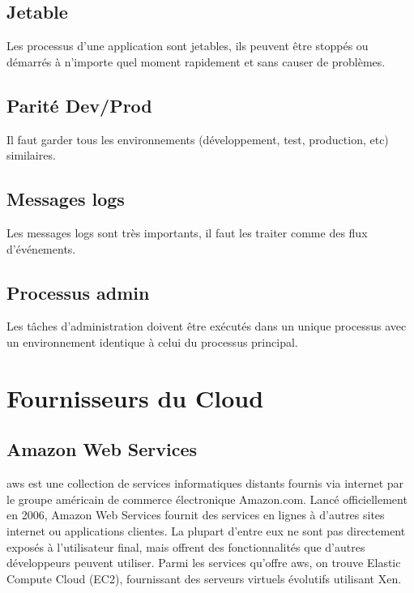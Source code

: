 \section*{Jetable}

Les processus d'une application sont jetables, ils peuvent être stoppés ou démarrés à n'importe quel moment rapidement et sans causer de problèmes.

\section*{Parité Dev/Prod}

Il faut garder tous les environnements (développement, test, production, etc) similaires.

\section*{Messages logs}

Les messages logs sont très importants, il faut les traiter comme des flux d'événements.

\section*{Processus admin}

Les tâches d'administration doivent être exécutés dans un unique processus avec un environnement identique à celui du processus principal. 

\chapter{Fournisseurs du Cloud}

\section*{Amazon Web Services}

\acrshort{aws} est une collection de services informatiques distants fournis via internet par le groupe américain de commerce électronique Amazon.com. Lancé officiellement en 2006, Amazon Web Services fournit des services en lignes à d'autres sites internet ou applications clientes. La plupart d'entre eux ne sont pas directement exposés à l'utilisateur final, mais offrent des fonctionnalités que d'autres développeurs peuvent utiliser. Parmi les services qu'offre \acrshort{aws}, on trouve Elastic Compute Cloud (EC2), fournissant des serveurs virtuels évolutifs utilisant Xen. 

